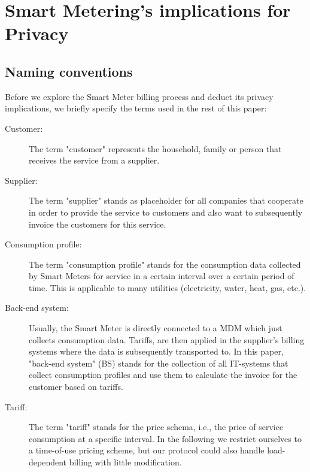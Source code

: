 \documentclass[english]{llncs}
\begin{document}
\section{Smart Metering's implications for Privacy}
\label{motivation}

\subsection{Naming conventions}

Before we explore the Smart Meter billing process and deduct its privacy implications,
we briefly specify the terms used in the rest of this paper:

\begin{description}

 \item [Customer:] The term "customer" represents the household, family or person that receives the service from a supplier.

 \item[Supplier:] The term "supplier" stands as placeholder for all companies that cooperate in order to provide the service to customers and also want to
subsequently invoice the customers for this service. 

 \item[Consumption profile:] The term "consumption profile" stands for the consumption data collected by Smart Meters for service in a certain interval over a certain period of time.
This is applicable to many utilities (electricity, water, heat, gas, etc.). 

 \item[Back-end system:] Usually, the Smart Meter is directly connected to a MDM which just collects consumption data.
Tariffs, are then applied in the supplier's billing systems where the data is subsequently transported to. In this paper, "back-end system" (BS) stands for the collection of all IT-systems that collect consumption profiles and use them to calculate the invoice for the customer based on tariffs.

 
 \item[Tariff:] The term "tariff" stands for the price schema, i.e., the price of service consumption at a specific interval.
In the following we restrict ourselves to a time-of-use pricing scheme, but our protocol could also handle load-dependent billing with little modification.

\end{description}
\end{document}
